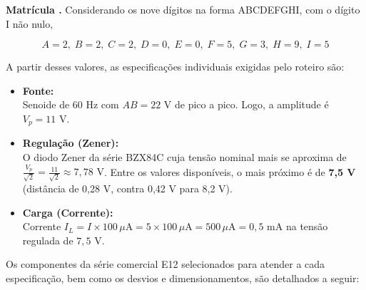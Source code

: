 \documentclass[11pt,a4paper]{article}
\begin{document}
\begin{espec}

\textbf{Matrícula .} Considerando os nove dígitos na forma ABCDEFGHI, com o dígito I não nulo,

\begin{equation}
    A=2,\; B=2,\; C=2,\; D=0,\; E=0,\; F=5,\; G=3,\; H=9,\; I=5
\end{equation}

A partir desses valores, as especificações individuais exigidas pelo roteiro são:

\begin{itemize}
    \item \textbf{Fonte:} \\
    Senoide de 60 Hz com $AB = 22\text{ V}$ de pico a pico. Logo, a amplitude é $V_p = 11\text{ V}$.

    \vspace{0.3cm}

    \item \textbf{Regulação (Zener):} \\
    O diodo Zener da série BZX84C cuja tensão nominal mais se aproxima de $\frac{V_p}{\sqrt{2}} = \frac{11}{\sqrt{2}} \approx 7{,}78\text{ V}$. Entre os valores disponíveis, o mais próximo é de \textbf{7,5 V} (distância de 0,28 V, contra 0,42 V para 8,2 V).

    \vspace{0.3cm}

    \item \textbf{Carga (Corrente):} \\
    Corrente $I_L = I \times 100\,\mu\text{A} = 5 \times 100\,\mu\text{A} = 500\,\mu\text{A} = 0{,}5\text{ mA}$ na tensão regulada de $7{,}5\text{ V}$.
\end{itemize}

\end{espec}

Os componentes da série comercial E12 selecionados para atender a cada especificação, bem como os desvios e dimensionamentos, são detalhados a seguir:
\end{document}
